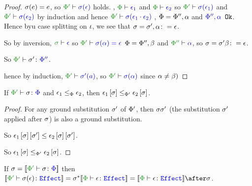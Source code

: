 \documentclass{report}
\begin{document}
\begin{framed}
    \begin{proof}
        $\si(e) = e$, so $\wellformed{\P'}{\si(\e)}$ holds.
        \bi, $\wellformed{\P}{\e_1}$ and $\wellformed{\P}{\e_2}$ so $\wellformed{\P'}{\si(\e_1)}$ and $\wellformed{\P'}{\si(\e_2)}$ by induction and hence $\wellformed{\P'}{\si(\e_1\dot\e_2)}$
        \bi, $\P=\P'',\a$ and $\ok{\P'',\a}$. Hence byu case splitting on $\i$, we see that $\si=\si', \a\setto\e$.
        
        So by inversion, $\wellformed{\si}{\e}$ so $\wellformed{\P'}{\si(\a)=\e}$
        \bi $\P=\P'', \b$ and $\wellformed{\P''}{\a}$, so $\si=\si'\b\setto\e$.
        
        So $\typerelation{\P'}{\si'}{\P''}$.
        
        hence by induction, $\wellformed{\P'}{\si'(a)}$, so $\wellformed{\P'}{\si(\a)}$ since $\a\neq\b)$
    \end{proof}
    
\end{framed}
\begin{theorem}
    If $\typerelation{\P'}{\si}{\P}$ and $\e_1\subeffectp\e_2$, then $\e_1\ssi\subeffect_{\P'}\e_2\ssi$.
\end{theorem}


\begin{framed}  
    \begin{proof}
        For any ground substitution $\si'$ of $\P'$, then $\si\si'$ (the substitution $\si'$ applied after $\si$) is also a ground substitution.
        
        So $\e_1\ssi\sub{\si'}\subeffect\e_2\ssi\sub{\si'}$. 
        
        So $\e_1\ssi\subeffect_{\P'}\e_2\ssi$.
        
    \end{proof}
\end{framed}

\begin{theorem}
    If $\si = \deno{\typerelation{\P'}{\si}{\P}}$ then $\deno{\typerelation{\P'}{\si(\e)}{\effect}} = \si\star\deno{\typerelation{\P}{\e}{\effect}} = \deno{\typerelation{\P}{\e}{\effect}}\after\si$.
    
\end{theorem}
\end{document}
